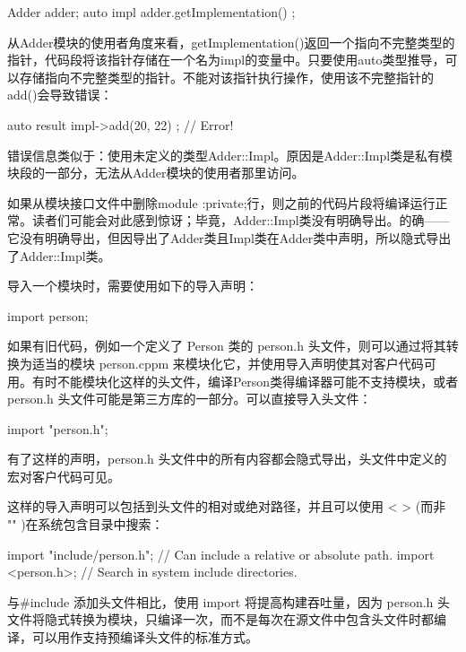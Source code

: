 \begin{cpp}
Adder adder;
auto impl { adder.getImplementation() };
\end{cpp}

从Adder模块的使用者角度来看，getImplementation()返回一个指向不完整类型的指针，代码段将该指针存储在一个名为impl的变量中。只要使用auto类型推导，可以存储指向不完整类型的指针。不能对该指针执行操作，使用该不完整指针的add()会导致错误：

\begin{cpp}
auto result { impl->add(20, 22) }; // Error!
\end{cpp}

错误信息类似于：使用未定义的类型Adder::Impl。原因是Adder::Impl类是私有模块段的一部分，无法从Adder模块的使用者那里访问。

如果从模块接口文件中删除module :private;行，则之前的代码片段将编译运行正常。读者们可能会对此感到惊讶；毕竟，Adder::Impl类没有明确导出。的确——它没有明确导出，但因导出了Adder类且Impl类在Adder类中声明，所以隐式导出了Adder::Impl类。


导入一个模块时，需要使用如下的导入声明：

\begin{cpp}
import person;
\end{cpp}

如果有旧代码，例如一个定义了 Person 类的 person.h 头文件，则可以通过将其转换为适当的模块 person.cppm 来模块化它，并使用导入声明使其对客户代码可用。有时不能模块化这样的头文件，编译Person类得编译器可能不支持模块，或者 person.h 头文件可能是第三方库的一部分。可以直接导入头文件：

\begin{cpp}
import "person.h";
\end{cpp}

有了这样的声明，person.h 头文件中的所有内容都会隐式导出，头文件中定义的宏对客户代码可见。

这样的导入声明可以包括到头文件的相对或绝对路径，并且可以使用 < > (而非 "" )在系统包含目录中搜索：

\begin{cpp}
import "include/person.h"; // Can include a relative or absolute path.
import <person.h>; // Search in system include directories.
\end{cpp}

与\#include 添加头文件相比，使用 import 将提高构建吞吐量，因为 person.h 头文件将隐式转换为模块，只编译一次，而不是每次在源文件中包含头文件时都编译，可以用作支持预编译头文件的标准方式。

